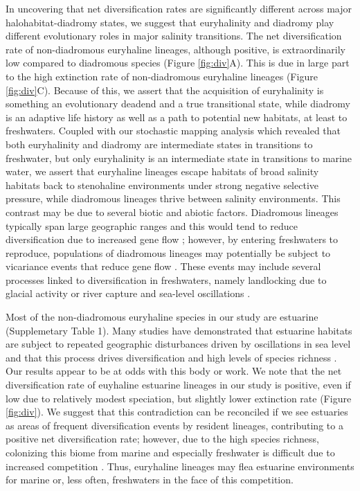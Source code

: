 \documentclass[11pt]{article}
\begin{document}
In uncovering that net diversification rates are significantly different across major halohabitat-diadromy states, we suggest that euryhalinity and diadromy play different evolutionary roles in major salinity transitions. The net diversification rate of non-diadromous euryhaline lineages, although positive, is extraordinarily low compared to diadromous species (Figure \ref{fig:div}A). This is due in large part to the high extinction rate of non-diadromous euryhaline lineages (Figure \ref{fig:div}C).  Because of this, we assert that the acquisition of euryhalinity is something an evolutionary deadend and a true transitional state, while diadromy is an adaptive life history as well as a path to potential new habitats, at least to freshwaters. Coupled with our stochastic mapping analysis which revealed that both euryhalinity and diadromy are intermediate states in transitions to freshwater, but only euryhalinity is an intermediate state in transitions to marine water, we assert that euryhaline lineages escape habitats of broad salinity habitats back to stenohaline environments under strong negative selective pressure, while diadromous lineages thrive between salinity environments. This contrast may be due to several biotic and abiotic factors. Diadromous lineages typically span large geographic ranges and this would tend to reduce diversification due to increased gene flow \citep{palumbi1994genetic}; however, by entering freshwaters to reproduce, populations of diadromous lineages may potentially be subject to vicariance events that reduce gene flow \citep{mcdowall2001diadromy,seehausen2014speciation}. These events may include several processes linked to diversification in freshwaters, namely landlocking due to glacial activity \citep{bell1994introduction} or river capture and sea-level oscillations \citep{feutry2013evolution, albert2020diversification}. 


Most of the non-diadromous euryhaline species in our study are estuarine (Supplemetary Table 1). Many studies have demonstrated that estuarine habitats are subject to repeated geographic disturbances driven by oscillations in sea level \citep{shen2011plio,marko2010expansion} and that this process drives diversification and high levels of species richness \citep{bilton2002dispersal, wilson2006genetic}. Our results appear to be at odds with this body or work. We note that the net diversification rate of euyhaline estuarine lineages in our study is positive, even if low due to relatively modest speciation, but slightly lower extinction rate (Figure \ref{fig:div}). We suggest that this contradiction can be reconciled if we see estuaries as areas of frequent diversification events by resident lineages, contributing to a positive net diversification rate; however, due to the high species richness, colonizing this biome from marine and especially freshwater is difficult due to increased competition \citep{betancur2012apparent, fukami2007immigration, meyer2007effects, brockhurst2007niche,wiens2005niche}. Thus, euryhaline lineages may flea estuarine environments for marine or, less often, freshwaters in the face of this competition.
\end{document}
